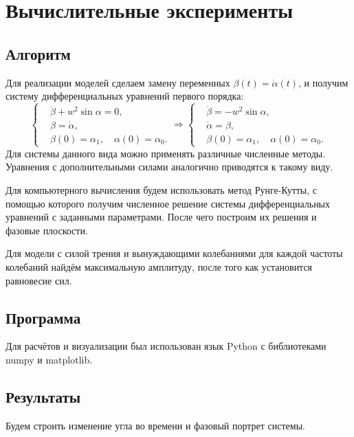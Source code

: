 \section{Вычислительные эксперименты}

    \subsection{Алгоритм}
        Для реализации моделей сделаем замену переменных \( \beta(t) = \dot{\alpha}(t) \), и получим систему дифференциальных уравнений первого порядка:
        \[
            \begin{cases}
                & \dot{\beta} + w^2 \sin \alpha = 0, \\
                & \beta = \dot{\alpha}, \\
                & \beta(0) = \alpha_1, \quad \alpha(0) = \alpha_0.
            \end{cases} \Rightarrow
            \begin{cases}
                & \dot{\beta} = - w^2 \sin \alpha, \\
                & \dot{\alpha} = \beta, \\
                & \beta(0) = \alpha_1, \quad \alpha(0) = \alpha_0.
            \end{cases}
        \]
        Для системы данного вида можно применять различные численные методы. Уравнения с дополнительными силами аналогично приводятся к такому виду.

        Для компьютерного вычисления будем использовать метод Рунге-Кутты, с помощью которого получим численное решение системы дифференциальных уравнений с заданными параметрами. После чего построим их решения и фазовые плоскости.

        Для модели с силой трения и вынуждающими колебаниями для каждой частоты колебаний найдём максимальную амплитуду, после того как установится равновесие сил.


    \subsection{Программа}
        Для расчётов и визуализации был использован язык Python с библиотеками numpy и matplotlib.

        

    \subsection{Результаты}
        Будем строить изменение угла во времени и фазовый портрет системы.
